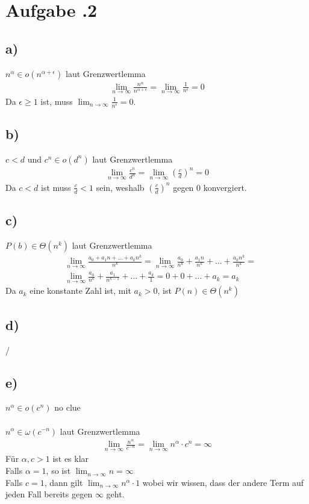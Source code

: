 \newpage
\section*{Aufgabe \bn.2}
\subsection*{a)}
$n ^{ \alpha }\in o(n ^{ \alpha + \epsilon } )$ laut Grenzwertlemma
\begin{align*}
  \lim_{n \rightarrow \infty} \frac{ n ^{ \alpha } }{ n ^{ \alpha + \epsilon }  } =
  \lim_{n \rightarrow \infty} \frac{ 1 }{ n ^{ \epsilon }  }  = 0
\end{align*}
Da $\epsilon \ge 1$ ist, muss $\lim_{n \rightarrow \infty} \frac{ 1 }{ n ^{ \epsilon }  }  = 0$.
\subsection*{b)}
$c < d$ und $c^n\in o(d^n)$ laut Grenzwertlemma
\begin{align*}
  \lim_{n \rightarrow \infty} \frac{ c^n }{ d^n } = \lim_{n \rightarrow \infty} \left( \frac{ c }{ d }  \right)^n = 0
\end{align*}
Da $c<d$ ist muss $\frac{ c }{ d } < 1$ sein, weshalb $ \left( \frac{ c }{ d }  \right)^n $ gegen 0 konvergiert.
\subsection*{c)}
$P(b) \in \Theta(n^k)$ laut Grenzwertlemma
\begin{align*}
  &\lim_{n \rightarrow \infty} \frac{ a_0 + a_1n + \ldots + a_kn^k }{ n^k } = \lim_{n \rightarrow \infty} \frac{ a_0 }{ n^k } + \frac{ a_1n }{ n^k } + \ldots + \frac{ a_kn^k }{ n^k } = \\
  &\lim_{n \rightarrow \infty} \frac{ a_0 }{ n^k } + \frac{ a_1 }{ n^{k-1} } + \ldots + \frac{ a_k }{ 1 } = 0 + 0 + \ldots + a_k = a_k
\end{align*}
Da $a_k$ eine konstante Zahl ist, mit $a_k > 0$, ist $P(n)\in\Theta(n^k)$
\subsection*{d)}
/
\subsection*{e)}
$n^\alpha \in o(c^n)$ no clue\\\\
$n^\alpha \in \omega(c^{-n})$ laut Grenzwertlemma
\begin{align*}
  \lim_{n \rightarrow \infty} \frac{ n^\alpha }{ c^{-n} } = \lim_{n \rightarrow \infty} n^\alpha \cdot c^n = \infty
\end{align*}
Für $\alpha,c > 1$ ist es klar\\
Falls $\alpha = 1$, so ist $\lim_{n \rightarrow \infty} n =\infty$ \\
Falls $c = 1$, dann gilt $ \lim_{n \rightarrow \infty} n^\alpha \cdot 1 $ wobei wir wissen, dass der andere Term auf jeden Fall bereits gegen $\infty$ geht.




